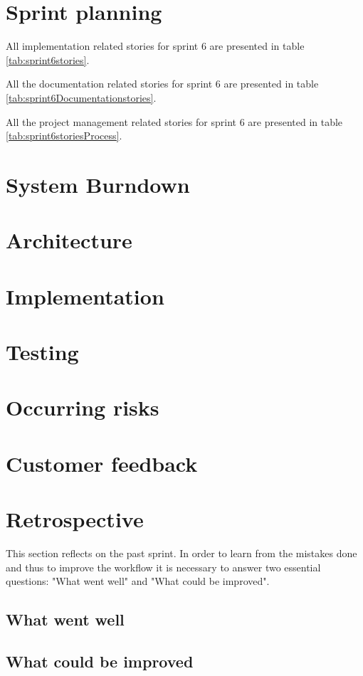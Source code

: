\section{Sprint planning}
All implementation related stories for sprint 6 are presented in table \ref{tab:sprint6stories}.


All the documentation related stories for sprint 6 are presented in table \ref{tab:sprint6Documentationstories}.


All the project management related stories for sprint 6 are presented in table \ref{tab:sprint6storiesProcess}.

\section{System Burndown}
\section{Architecture}
\section{Implementation}
\section{Testing}
\section{Occurring risks}
\section{Customer feedback}
\section{Retrospective}
This section reflects on the past sprint. In order to learn from the mistakes done and thus to improve the workflow it is necessary to answer two essential questions: "What went well" and "What could be improved".

\subsection{What went well}
\subsection{What could be improved}

